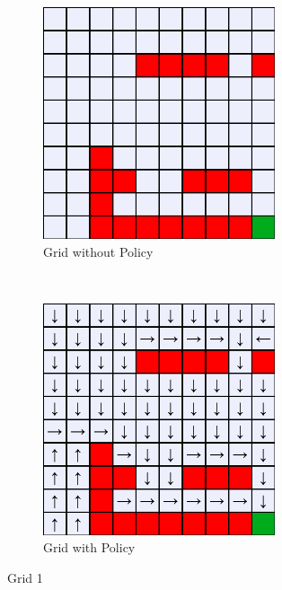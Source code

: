 \documentclass[a4paper, 11pt]{article}
\begin{document}
\begin{figure}[h!]
    \centering
    \begin{subfigure}[t]{0.5\textwidth}
        \centering
        \includegraphics[width=0.75\textwidth]{Images_Q1/grid1_default.png}
        \caption{Grid without Policy}
    \end{subfigure}%
    ~ 
    \begin{subfigure}[t]{0.5\textwidth}
        \centering
        \includegraphics[width=0.75\textwidth]{Images_Q1/grid1.png}
        \caption{Grid with Policy}
    \end{subfigure}
    \caption{Grid 1}
    \label{fig:grid1}
\end{figure}
\newpage
\end{document}
